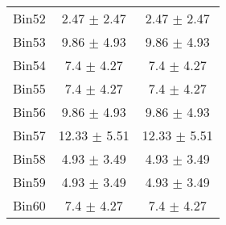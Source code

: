\begin{tabular}{|c|c|c|}
     Bin52 & 2.47 $\pm$ 2.47 & 2.47 $\pm$ 2.47 \\ \cline{1-3} 
     Bin53 & 9.86 $\pm$ 4.93 & 9.86 $\pm$ 4.93 \\ \cline{1-3} 
     Bin54 & 7.4 $\pm$ 4.27 & 7.4 $\pm$ 4.27 \\ \cline{1-3} 
     Bin55 & 7.4 $\pm$ 4.27 & 7.4 $\pm$ 4.27 \\ \cline{1-3} 
     Bin56 & 9.86 $\pm$ 4.93 & 9.86 $\pm$ 4.93 \\ \cline{1-3} 
     Bin57 & 12.33 $\pm$ 5.51 & 12.33 $\pm$ 5.51 \\ \cline{1-3} 
     Bin58 & 4.93 $\pm$ 3.49 & 4.93 $\pm$ 3.49 \\ \cline{1-3} 
     Bin59 & 4.93 $\pm$ 3.49 & 4.93 $\pm$ 3.49 \\ \cline{1-3} 
     Bin60 & 7.4 $\pm$ 4.27 & 7.4 $\pm$ 4.27 \\ \cline{1-3} 
  \end{tabular}
